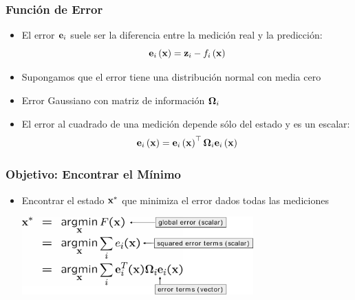 \begin{frame}
    \frametitle{Función de Error}
    
    \begin{itemize}
        \item El error $\boldsymbol{\mathbf{e}}_{i}$ suele ser la diferencia entre la medición real y la predicción:
            \begin{equation*}
                \boldsymbol{\mathbf{e}}_{i}\left( \boldsymbol{\mathbf{x}} \right) = \boldsymbol{\mathbf{z}}_{i} - f_{i}\left( \boldsymbol{\mathbf{x}} \right)
            \end{equation*}
        \item Supongamos que el error tiene una distribución normal con media cero
        \item Error Gaussiano con matriz de información $\boldsymbol{\mathbf{\Omega}}_{i}$
        \item El error al cuadrado de una medición depende sólo del estado y es un escalar:
            \begin{equation*}
                \boldsymbol{\mathbf{e}}_{i}\left( \boldsymbol{\mathbf{x}} \right) = \boldsymbol{\mathbf{e}}_{i}\left( \boldsymbol{\mathbf{x}} \right)^{\top} \boldsymbol{\mathbf{\Omega}}_{i} \boldsymbol{\mathbf{e}}_{i}\left( \boldsymbol{\mathbf{x}} \right)
            \end{equation*}
    \end{itemize}
\end{frame}

\begin{frame}
    \frametitle{Objetivo: Encontrar el Mínimo}
    
    \begin{itemize}
        \item Encontrar el estado $\boldsymbol{\mathbf{x}}^{*}$ que minimiza el error dados todas las mediciones
        
        \begin{center}
            \includegraphics[width=0.7\textwidth]{images/find_minimum.pdf}
        \end{center}
    \end{itemize}

\end{frame}

